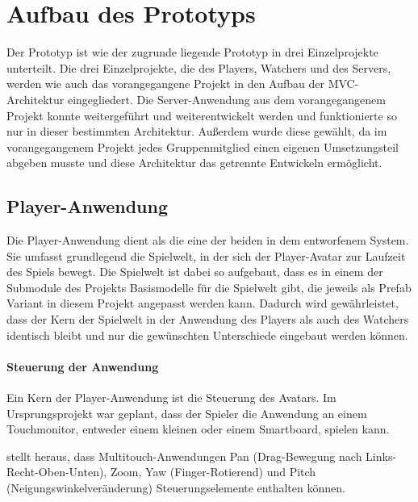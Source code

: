 \section{Aufbau des Prototyps}
Der Prototyp ist wie der zugrunde liegende Prototyp in drei Einzelprojekte unterteilt. Die drei Einzelprojekte, die des Players, Watchers und des Servers, werden wie auch das vorangegangene Projekt in den Aufbau der \ac{MVC}-Architektur eingegliedert. Die Server-Anwendung aus dem vorangegangenem Projekt konnte weitergeführt und weiterentwickelt werden und funktionierte so nur in dieser bestimmten Architektur. Außerdem wurde diese gewählt, da im vorangegangenem Projekt jedes Gruppenmitglied einen eigenen Umsetzungsteil abgeben musste und diese Architektur das getrennte Entwickeln ermöglicht.

\subsection{Player-Anwendung}
Die Player-Anwendung dient als die eine der beiden  in dem entworfenem System. Sie umfasst grundlegend die Spielwelt, in der sich der Player-Avatar zur Laufzeit des Spiels bewegt. Die Spielwelt ist dabei so aufgebaut, dass es in einem der Submodule des Projekts Basismodelle für die Spielwelt gibt, die jeweils als Prefab Variant in diesem Projekt angepasst werden kann. Dadurch wird gewährleistet, dass der Kern der Spielwelt in der Anwendung des Players als auch des Watchers identisch bleibt und nur die gewünschten Unterschiede eingebaut werden können.

\paragraph{Steuerung der Anwendung}

Ein Kern der Player-Anwendung ist die Steuerung des Avatars. Im Ursprungsprojekt war geplant, dass der Spieler die Anwendung an einem Touchmonitor, entweder einem kleinen oder einem Smartboard, spielen kann.

\cite{reinhard_augmented_2022} stellt heraus, dass Multitouch-Anwendungen Pan (Drag-Bewegung nach Links-Recht-Oben-Unten), Zoom, Yaw (Finger-Rotierend) und Pitch (Neigungswinkelveränderung) Steuerungselemente enthalten können. 

